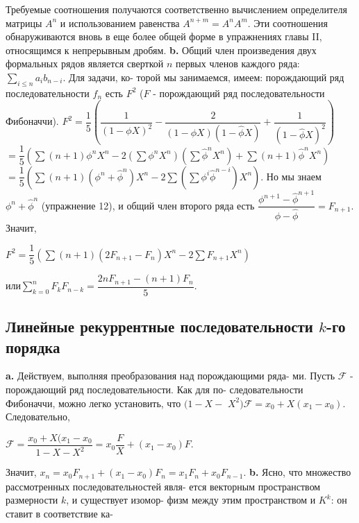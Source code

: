\documentclass{mai_book}
\begin{document}
\hspace*{15pt}Требуемые соотношения получаются соответственно вычислением
определителя матрицы $A^n$ и использованием равенства $A^{n+m}=A^n A^m$.
Эти соотношения обнаруживаются вновь в еще более общей форме в
упражнениях главы II, относящимся к непрерывным дробям.\newline
\hspace*{15pt}\textbf{b.} Общий член произведения двух формальных рядов является
сверткой $n$ первых членов каждого ряда: $\sum_{i \leq n}a_ib_{n-i}$. Для задачи, ко-
торой мы занимаемся, имеем: порождающий ряд последовательности
$f_n$ есть $F^2$ ($F$ - порождающий ряд последовательности Фибоначчи).\newline
$F^2=\dfrac{1}{5}\left(\dfrac{1}{(1-\phi X)^2}-\dfrac{2}{(1-\phi X)(1-\hat{\phi} X)}+\dfrac{1}{(1-\hat{\phi} X)^2}\right)$\newline
\hspace*{15pt}$=\dfrac{1}{5}\left(\sum(n+1)\phi^nX^n-2(\sum\phi^nX^n)(\sum\hat{\phi}^nX^n)+\sum(n+1)\hat{\phi}^nX^n\right)$\newline
\hspace*{15pt}$=\dfrac{1}{5}\left(\sum(n+1)(\phi^n+\hat{\phi}^n)X^n-2\sum(\sum\phi^i\hat{\phi}^{n-i})X^n\right)$.\newline
Но мы знаем $\phi^n+\hat{\phi}^n$ (упражнение 12), и общий член второго ряда есть
$\dfrac{\phi^{n+1}-\hat{\phi}^{n+1}}{\phi-\hat{\phi}}=F_{n+1}$. Значит,
\begin{center}
$F^2=\dfrac{1}{5}\left(\sum(n+1)(2F_{n+1}-F_n)X^n-2\sum F_{n+1}X^n\right)$
\end{center}
\begin{center}
или\hspace{15pt}$\displaystyle\sum_{k=0}^nF_kF_{n-k} = \dfrac{2nF_{n+1}-(n+1)F_n}{5}$.
\end{center}
\subsection{Линейные рекуррентные последовательности $k$-го порядка}
\hspace*{15pt}\textbf{a.} Действуем, выполняя преобразования над порождающими ряда-
ми. Пусть $\mathcal{F}$ - порождающий ряд последовательности. Как для по-
следовательности Фибоначчи, можно легко установить, что $(1-X-$
$X^2)\mathcal{F}=x_0+X(x_1-x_0)$. Следовательно,
\begin{center}
$\mathcal{F}=\dfrac{x_0+X(x_1-x_0}{1-X-X^2}=x_0\dfrac{F}{X}+(x_1-x_0)F$.
\end{center}
Значит, $x_n=x_0F_{n+1}+(x_1-x_0)F_n=x_1F_n+x_0F_{n-1}$.\newline
\hspace*{15pt}\textbf{b.} Ясно, что множество рассмотренных последовательностей явля-
ется векторным пространством размерности $k$, и существует изомор-
физм между этим пространством и $K^k$: он ставит в соответствие ка-\newpage
\end{document}
